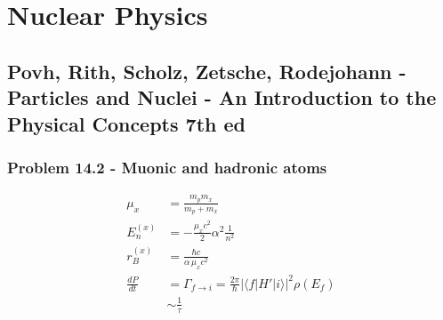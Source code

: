\documentclass[10pt,a4paper]{book}
\theoremstyle{definition}
\begin{document}
\chapter{Nuclear Physics}
\section{{\sc Povh, Rith, Scholz, Zetsche, Rodejohann} - Particles and Nuclei - An Introduction to the Physical Concepts 7th ed}

\subsection{Problem 14.2 - Muonic and hadronic atoms}

\begin{align}
\mu_x&=\frac{m_pm_x}{m_p+m_x}\\
E_n^{(x)}&=-\frac{\mu_x c^2}{2}\alpha^2\frac{1}{n^2}\\
r_B^{(x)}&=\frac{\hbar c}{\alpha\, \mu_x c^2}\\
\frac{dP}{dt}&=\Gamma_{f\rightarrow i}=\frac{2\pi}{\hbar}|\langle f|H'|i\rangle|^2\rho(E_f)\\
&\sim\frac{1}{\tau}
\end{align}
\end{document}

